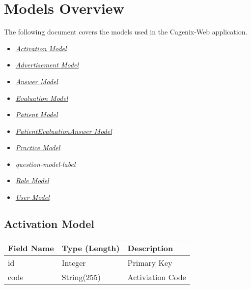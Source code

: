 \documentclass[letterpaper,10pt,english]{sphinxmanual}
\begin{document}
\chapter{Models Overview}
\label{dev-models:models-overview}\label{dev-models::doc}
The following document covers the models used in the Cagenix-Web application.
\begin{itemize}
\item {} 
{\hyperref[dev-models:activation-model-label]{\emph{Activation Model}}}

\item {} 
{\hyperref[dev-models:advertisement-model-label]{\emph{Advertisement Model}}}

\item {} 
{\hyperref[dev-models:answer-model-label]{\emph{Answer Model}}}

\item {} 
{\hyperref[dev-models:evaluation-model-label]{\emph{Evaluation Model}}}

\item {} 
{\hyperref[dev-models:patient-model-label]{\emph{Patient Model}}}

\item {} 
{\hyperref[dev-models:patientevaluationanswer-model-label]{\emph{PatientEvaluationAnswer Model}}}

\item {} 
{\hyperref[dev-models:practice-model-label]{\emph{Practice Model}}}

\item {} 
\emph{question-model-label}

\item {} 
{\hyperref[dev-models:role-model-label]{\emph{Role Model}}}

\item {} 
{\hyperref[dev-models:user-model-label]{\emph{User Model}}}

\end{itemize}


\section{Activation Model}
\label{dev-models:activation-model}\label{dev-models:activation-model-label}
\begin{tabulary}{\linewidth}{|L|L|L|}
\hline
\textsf{\relax 
Field Name
} & \textsf{\relax 
Type (Length)
} & \textsf{\relax 
Description
}\\
\hline
id
 & 
Integer
 & 
Primary Key
\\

code
 & 
String(255)
 & 
Activiation Code
\\
\hline\end{tabulary}
\end{document}

